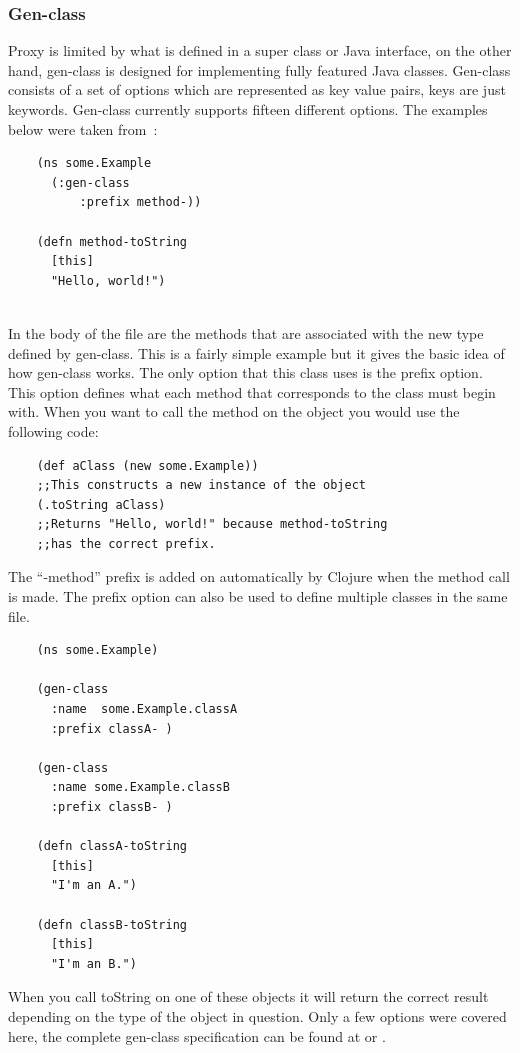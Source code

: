 \documentclass[12pt]{article}
\begin{document}
	\subsubsection{Gen-class}
	Proxy is limited by what is defined in a super class or Java interface, on the other hand, gen-class is designed for implementing fully featured Java classes. Gen-class consists of a set of options which are represented as key value pairs, keys are just keywords. Gen-class currently supports fifteen different options. The examples below were taken from~\cite{kotka}:
	
	\newpage
	\begin{verbatim}
	(ns some.Example
	  (:gen-class 
	      :prefix method-))
	  
	(defn method-toString
	  [this]
	  "Hello, world!")
	  
	\end{verbatim}
	
	In the body of the file are the methods that are associated with the new type defined by gen-class. This is a fairly simple example but it gives the basic idea of how gen-class works. The only option that this class uses is the prefix option. This option defines what each method that corresponds to the class must begin with. When you want to call the method on the object you would use the following code:
	
	\begin{verbatim}
	(def aClass (new some.Example))
	;;This constructs a new instance of the object
	(.toString aClass)
	;;Returns "Hello, world!" because method-toString 
	;;has the correct prefix.
	\end{verbatim}
	
	The ``-method'' prefix is added on automatically by Clojure when the method call is made. The prefix option can also be used to define multiple classes in the same file.
	
	\begin{verbatim}
	(ns some.Example)
	
	(gen-class
	  :name  some.Example.classA
	  :prefix classA- )
	  
	(gen-class
	  :name some.Example.classB
	  :prefix classB- )
	  
	(defn classA-toString
	  [this]
	  "I'm an A.")
	  
	(defn classB-toString
	  [this]
	  "I'm an B.")
	\end{verbatim}
	
	When you call toString on one of these objects it will return the correct result depending on the type of the object in question. Only a few options were covered here, the complete gen-class specification can be found at \cite{docs:genClass} or \cite{api:genClass}. 
\end{document}
